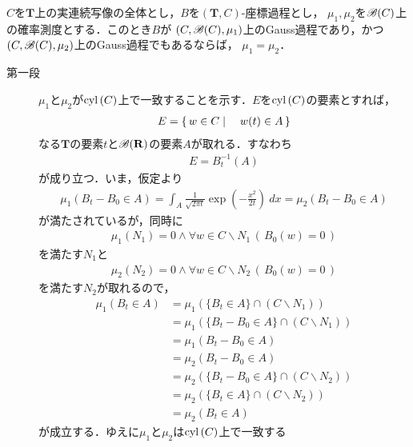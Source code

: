 	\begin{screen}
		\begin{dfn}[座標過程をGauss過程とする確率測度の一意性]\label{thm:uniqueness_of_gauss_measure}
			$C$を$\mathbf{T}$上の実連続写像の全体とし，$B$を$(\mathbf{T},C)$-座標過程とし，
			$\mu_1,\mu_2$を$\mathscr{B}(C)$上の確率測度とする．このとき$B$が
			$(C,\mathscr{B}(C),\mu_1)$上のGauss過程であり，かつ
			$(C,\mathscr{B}(C),\mu_2)$上のGauss過程でもあるならば，
			$\mu_1 = \mu_2$．
		\end{dfn}
	\end{screen}
	
	\begin{prf}\mbox{}
		\begin{description}
			\item[第一段]
				$\mu_1$と$\mu_2$が$\operatorname{cyl}\left(C\right)$上で一致することを示す．$E$を$\operatorname{cyl}\left(C\right)$の要素とすれば，
				\begin{align}
					E = \left\{\, w \in C \mid \quad w(t) \in A\, \right\}
				\end{align}
				なる$\mathbf{T}$の要素$t$と$\mathscr{B}(\mathbf{R})$の要素$A$が取れる．すなわち
				\begin{align}
					E = B_t^{-1}(A)
				\end{align}
				が成り立つ．いま，仮定より
				\begin{align}
					\mu_1(B_t - B_0 \in A) = \int_A \frac{1}{\sqrt{2\pi t}} \exp\left(-\frac{x^2}{2t}\right)\ dx
					= \mu_2(B_t - B_0 \in A)
				\end{align}
				が満たされているが，同時に
				\begin{align}
					\mu_1(N_1) = 0 \wedge \forall w \in C \backslash N_1\, \left(\, B_0(w) = 0\, \right)
				\end{align}
				を満たす$N_1$と
				\begin{align}
					\mu_2(N_2) = 0 \wedge \forall w \in C \backslash N_2\, \left(\, B_0(w) = 0\, \right)
				\end{align}
				を満たす$N_2$が取れるので，
				\begin{align}
					\mu_1(B_t \in A) &= \mu_1\left(\{B_t \in A\} \cap (C \backslash N_1)\right) \\
					&= \mu_1\left(\{B_t - B_0 \in A\} \cap (C \backslash N_1)\right) \\
					&= \mu_1(B_t - B_0 \in A) \\
					&= \mu_2(B_t - B_0 \in A) \\
					&= \mu_2\left(\{B_t - B_0 \in A\} \cap (C \backslash N_2)\right) \\
					&= \mu_2\left(\{B_t \in A\} \cap (C \backslash N_2)\right) \\
					&= \mu_2(B_t \in A)
				\end{align}
				が成立する．ゆえに$\mu_1$と$\mu_2$は$\operatorname{cyl}\left(C\right)$上で一致する
				

\end{description}
\end{prf}
